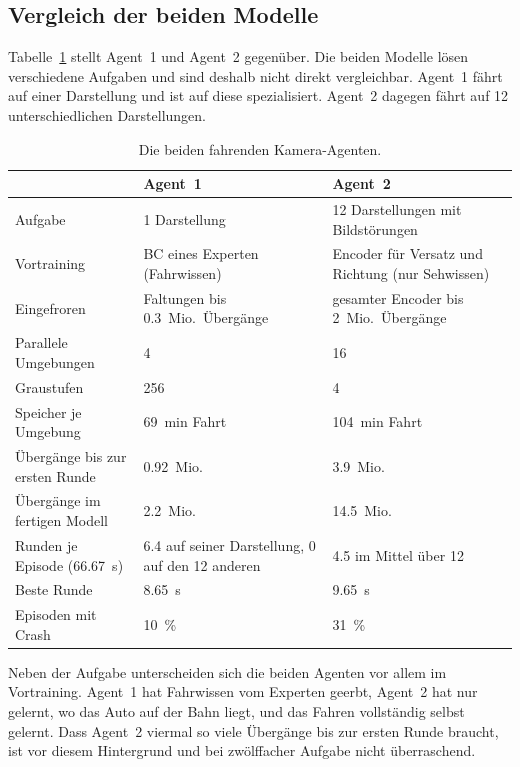 \subsection{Vergleich der beiden Modelle}
\label{sec:agentenvergleich}

Tabelle~\ref{tab:agentenvergleich} stellt Agent~1 und Agent~2 gegenüber. Die beiden Modelle lösen verschiedene Aufgaben und sind deshalb nicht direkt vergleichbar. Agent~1 fährt auf einer Darstellung und ist auf diese spezialisiert. Agent~2 dagegen fährt auf 12 unterschiedlichen Darstellungen.

\begin{table}[htbp]
  \centering
  \caption{Die beiden fahrenden Kamera-Agenten.}
  \label{tab:agentenvergleich}
  \small
  \begin{tabularx}{\linewidth}{@{}l X X@{}}
    \toprule
     & \textbf{Agent~1} & \textbf{Agent~2} \\
    \midrule
    Aufgabe                          & 1 Darstellung & 12 Darstellungen mit Bildstörungen \\
    Vortraining                      & \ac{BC} eines Experten (Fahrwissen) & Encoder für Versatz und Richtung (nur Sehwissen) \\
    Eingefroren                      & Faltungen bis \num{0.3}~Mio.\ Übergänge & gesamter Encoder bis 2~Mio.\ Übergänge \\
    Parallele Umgebungen             & 4 & 16 \\
    Graustufen                       & 256 & 4 \\
    Speicher je Umgebung             & \SI{69}{\minute} Fahrt & \SI{104}{\minute} Fahrt \\
    Übergänge bis zur ersten Runde   & \num{0.92}~Mio. & \num{3.9}~Mio. \\
    Übergänge im fertigen Modell     & \num{2.2}~Mio. & \num{14.5}~Mio. \\
    Runden je Episode (\SI{66.67}{\second}) & \num{6.4} auf seiner Darstellung, 0 auf den 12 anderen & \num{4.5} im Mittel über 12 \\
    Beste Runde                      & \SI{8.65}{\second} & \SI{9.65}{\second} \\
    Episoden mit Crash               & \SI{10}{\percent} & \SI{31}{\percent} \\
    \bottomrule
  \end{tabularx}
\end{table}

Neben der Aufgabe unterscheiden sich die beiden Agenten vor allem im Vortraining. Agent~1 hat Fahrwissen vom Experten geerbt, Agent~2 hat nur gelernt, wo das Auto auf der Bahn liegt, und das Fahren vollständig selbst gelernt. Dass Agent~2 viermal so viele Übergänge bis zur ersten Runde braucht, ist vor diesem Hintergrund und bei zwölffacher Aufgabe nicht überraschend.

